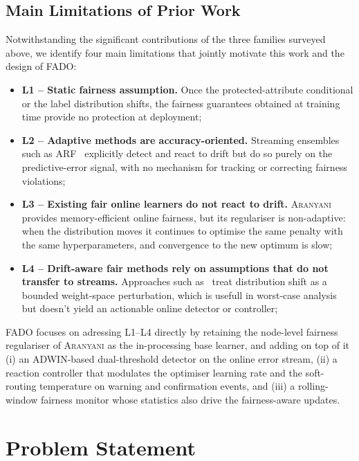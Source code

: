 \documentclass[sigconf,anonymous,review]{acmart}
\begin{document}
\subsection{Main Limitations of Prior Work}
\label{sec:related:limitations}
Notwithstanding the significant contributions of the three families surveyed above, we identify four main limitations that jointly motivate this work and the design of \textsc{FADO}:
\begin{itemize}
  \item \textbf{L1 -- Static fairness assumption.} Once the protected-attribute conditional or the label distribution shifts, the fairness guarantees obtained at training time provide no protection at deployment;
  \item \textbf{L2 -- Adaptive methods are accuracy-oriented.} Streaming ensembles such as \textsc{ARF}~\cite{10.1007/s10994-017-5642-8} explicitly detect and react to drift but do so purely on the predictive-error signal, with no mechanism for tracking or correcting fairness violations;
  \item \textbf{L3 -- Existing fair online learners do not react to drift.} \textsc{Aranyani}~\cite{chowdhury2024enhancing} provides memory-efficient online fairness, but its regulariser is non-adaptive: when the distribution moves it continues to optimise the same penalty with the same hyperparameters, and convergence to the new optimum is slow;
  \item \textbf{L4 -- Drift-aware fair methods rely on assumptions that do not transfer to streams.} Approaches such as~\cite{jiang2023chasingfairnessdistributionshift} treat distribution shift as a bounded weight-space perturbation, which is usefull in worst-case analysis but doesn't yield an actionable online detector or controller;
\end{itemize}
\textsc{FADO} focuses on adressing L1--L4 directly by retaining the node-level fairness regulariser of \textsc{Aranyani} as the in-processing base learner, and adding on top of it (i) an ADWIN-based dual-threshold detector on the online error stream, (ii) a reaction controller that modulates the optimiser learning rate and the soft-routing temperature on warning and confirmation events, and (iii) a rolling-window fairness monitor whose statistics also drive the fairness-aware updates.

\section{Problem Statement}
\end{document}
